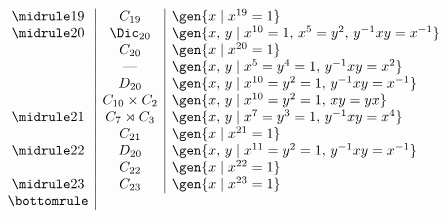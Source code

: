 \begin{displaymath}
\begin{array}{c|c|l}
\midrule
19 & C_{19} & \gen{x \mid x^{19} = 1} \\
\midrule
20 & \Dic_{20} & \gen{x,\,y \mid x^{10} = 1,\, x^5 = y^2,\, y^{-1}xy = x^{-1}} \\
   & C_{20} & \gen{x \mid x^{20} = 1} \\
   & \text{---} & \gen{x,\,y \mid x^5 = y^4 = 1,\, y^{-1}xy = x^2} \\
   & D_{20} & \gen{x,\,y \mid x^{10} = y^2 = 1,\, y^{-1}xy = x^{-1}} \\
   & C_{10} \times C_{2} & \gen{x,\,y \mid x^{10} = y^2 = 1,\, xy = yx} \\
\midrule
21 & C_{7} \rtimes C_3 & \gen{x,\,y \mid x^7 = y^3 = 1,\, y^{-1}xy = x^4} \\
   & C_{21} & \gen{x \mid x^{21} = 1} \\
\midrule
22 & D_{20} & \gen{x,\,y \mid x^{11} = y^2 = 1,\, y^{-1}xy = x^{-1}} \\
   & C_{22} & \gen{x \mid x^{22} = 1} \\
\midrule
23 & C_{23} & \gen{x \mid x^{23} = 1} \\

\bottomrule
\end{array}
\end{displaymath}


